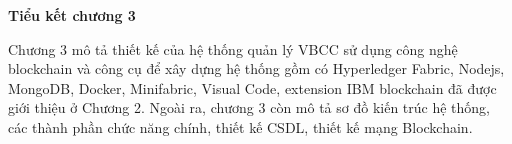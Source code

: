 \begin{enumerate}
\end{enumerate}

\textbf{Tiểu kết chương 3}

Chương 3 mô tả thiết kế của hệ thống quản lý VBCC sử dụng công nghệ blockchain và công cụ để xây dựng hệ thống gồm có Hyperledger Fabric, Nodejs, MongoDB, Docker, Minifabric, Visual Code, extension IBM blockchain đã được giới thiệu ở Chương 2. Ngoài ra, chương 3 còn mô tả sơ đồ kiến trúc hệ thống, các thành phần chức năng chính, thiết kế CSDL, thiết kế mạng Blockchain. 
